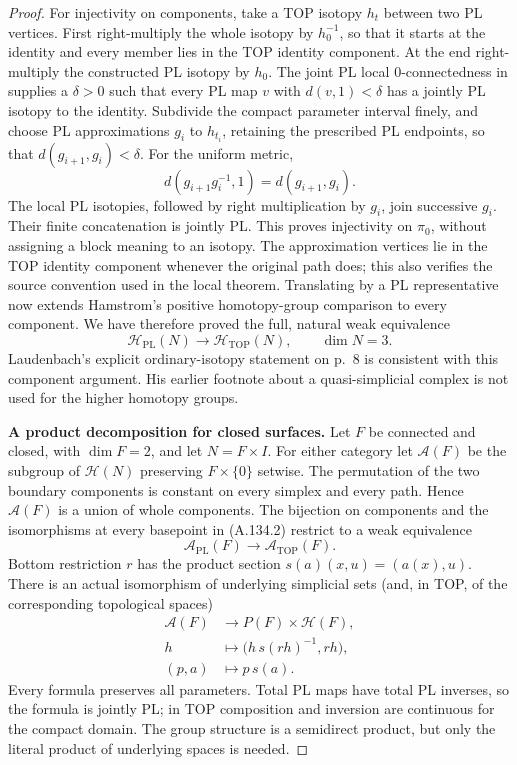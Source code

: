 \begin{proof}
For injectivity on components, take a TOP isotopy $h_t$ between two PL
vertices. First right-multiply the whole isotopy by $h_0^{-1}$, so that
it starts at the identity and every member lies in the TOP identity
component. At the end right-multiply the constructed PL isotopy by $h_0$.
The joint PL local $0$-connectedness in
\cite[Theorem~2.3.1, p.~224, with the definition on p.~222]{Hamstrom1974}
supplies a $\delta>0$ such that every PL map $v$ with
$d(v,1)<\delta$ has a jointly PL isotopy to the identity. Subdivide the
compact parameter interval finely, and choose PL approximations $g_i$ to
$h_{t_i}$, retaining the prescribed PL endpoints, so that
$d(g_{i+1},g_i)<\delta$. For the uniform metric,
\[
 d(g_{i+1}g_i^{-1},1)=d(g_{i+1},g_i).
\]
The local PL isotopies, followed by right multiplication by $g_i$, join
successive $g_i$. Their finite concatenation is jointly PL. This proves
injectivity on $\pi_0$, without assigning a block meaning to an isotopy.
The approximation vertices lie in the TOP identity component whenever
the original path does; this also verifies the source convention used
in the local theorem. Translating by a PL representative now extends
Hamstrom's positive homotopy-group comparison to every component.
We have therefore proved the full, natural weak equivalence
\[
 \mathcal H_{\mathrm{PL}}(N)\longrightarrow
 \mathcal H_{\mathrm{TOP}}(N),\qquad \dim N=3.
                                                        \tag{A.134.2}
\]
Laudenbach's explicit ordinary-isotopy statement on p.~8 is consistent
with this component argument. His earlier footnote about a
quasi-simplicial complex is not used for the higher homotopy groups.

\textbf{A product decomposition for closed surfaces.}
Let $F$ be connected and closed, with $\dim F=2$, and let $N=F\times I$.
For either category let $\mathcal A(F)$ be the subgroup of
$\mathcal H(N)$ preserving $F\times\{0\}$ setwise.
The permutation of the two boundary components is constant on every
simplex and every path. Hence $\mathcal A(F)$ is a union of whole
components. The bijection on components and the isomorphisms at every
basepoint in (A.134.2) restrict to a weak equivalence
\[
 \mathcal A_{\mathrm{PL}}(F)\longrightarrow
 \mathcal A_{\mathrm{TOP}}(F).
                                                        \tag{A.134.3}
\]
Bottom restriction $r$ has the product section
$s(a)(x,u)=(a(x),u)$. There is an actual isomorphism of underlying
simplicial sets (and, in TOP, of the corresponding topological spaces)
\[
 \begin{split}
 \mathcal A(F)&\longrightarrow P(F)\times\mathcal H(F),\\
 h&\longmapsto\bigl(h\,s(rh)^{-1},rh\bigr),\\
 (p,a)&\longmapsto p\,s(a).
 \end{split}                                            \tag{A.134.4}
\]
Every formula preserves all parameters. Total PL maps have total PL
inverses, so the formula is jointly PL; in TOP composition and inversion
are continuous for the compact domain. The group structure is a
semidirect product, but only the literal product of underlying spaces
is needed.


\end{proof}
